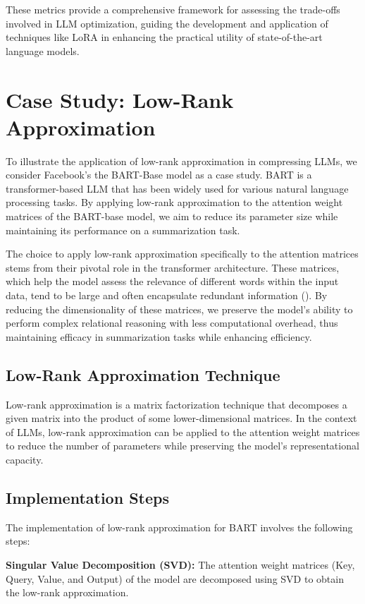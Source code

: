         These metrics provide a comprehensive framework for assessing the trade-offs involved in LLM optimization, guiding the development and application of techniques like LoRA in enhancing the practical utility of state-of-the-art language models.

\section{Case Study: Low-Rank Approximation}
    To illustrate the application of low-rank approximation in compressing LLMs, we consider Facebook's the BART-Base model as a case study. BART is a transformer-based LLM that has been widely used for various natural language processing tasks. By applying low-rank approximation to the attention weight matrices of the BART-base model, we aim to reduce its parameter size while maintaining its performance on a summarization task.

    The choice to apply low-rank approximation specifically to the attention matrices stems from their pivotal role in the transformer architecture. These matrices, which help the model assess the relevance of different words within the input data, tend to be large and often encapsulate redundant information (\cite{aghajanyan2020intrinsic}). By reducing the dimensionality of these matrices, we preserve the model's ability to perform complex relational reasoning with less computational overhead, thus maintaining efficacy in summarization tasks while enhancing efficiency.
    \subsection{Low-Rank Approximation Technique}
        Low-rank approximation is a matrix factorization technique that decomposes a given matrix into the product of some lower-dimensional matrices. In the context of LLMs, low-rank approximation can be applied to the attention weight matrices to reduce the number of parameters while preserving the model's representational capacity.

    \subsection{Implementation Steps}
        The implementation of low-rank approximation for BART involves the following steps:
        
        \textbf{Singular Value Decomposition (SVD):} The attention weight matrices (Key, Query, Value, and Output) of the model are decomposed using SVD to obtain the low-rank approximation.
        
